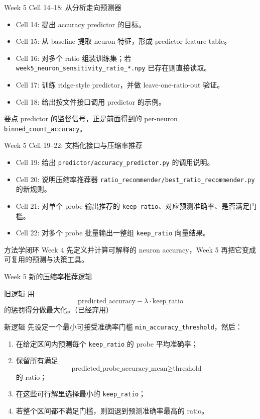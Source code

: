\documentclass[aspectratio=169,11pt]{beamer}
\begin{document}
\begin{frame}{Week 5 Cell 14--18: 从分析走向预测器}
  \begin{itemize}
    \item Cell 14: 提出 accuracy predictor 的目标。
    \item Cell 15: 从 baseline 提取 neuron 特征，形成 predictor feature table。
    \item Cell 16: 对多个 ratio 组装训练集；若 \texttt{week5\_neuron\_sensitivity\_ratio\_*.npy} 已存在则直接读取。
    \item Cell 17: 训练 ridge-style predictor，并做 leave-one-ratio-out 验证。
    \item Cell 18: 给出按文件接口调用 predictor 的示例。
  \end{itemize}
  \begin{block}{要点}
    predictor 的监督信号，正是前面得到的 per-neuron \texttt{binned\_count\_accuracy}。
  \end{block}
\end{frame}

\begin{frame}{Week 5 Cell 19--22: 文档化接口与压缩率推荐}
  \begin{itemize}
    \item Cell 19: 给出 \texttt{predictor/accuracy\_predictor.py} 的调用说明。
    \item Cell 20: 说明压缩率推荐器 \texttt{ratio\_recommender/best\_ratio\_recommender.py} 的新规则。
    \item Cell 21: 对单个 probe 输出推荐的 \texttt{keep\_ratio}、对应预测准确率、是否满足门槛。
    \item Cell 22: 对多个 probe 批量输出一整组 \texttt{keep\_ratio} 向量结果。
  \end{itemize}
  \begin{block}{方法学闭环}
    Week 4 先定义并计算可解释的 neuron accuracy，Week 5 再把它变成可复用的预测与决策工具。
  \end{block}
\end{frame}

\begin{frame}{Week 5 新的压缩率推荐逻辑}
  \begin{block}{旧逻辑}
    用
    \[
      \text{predicted\_accuracy} - \lambda \cdot \text{keep\_ratio}
    \]
    的惩罚得分做最大化。（已经弃用）
  \end{block}
  \begin{block}{新逻辑}
    先设定一个最小可接受准确率门槛 \texttt{min\_accuracy\_threshold}，然后：
    \begin{enumerate}
      \item 在给定区间内预测每个 \texttt{keep\_ratio} 的 probe 平均准确率；
      \item 保留所有满足
      \[
        \text{predicted\_probe\_accuracy\_mean} \ge \text{threshold}
      \]
      的 ratio；
      \item 在这些可行解里选择\alert{最小的 \texttt{keep\_ratio}}；
      \item 若整个区间都不满足门槛，则回退到预测准确率最高的 ratio。
    \end{enumerate}
  \end{block}
\end{frame}
\end{document}
